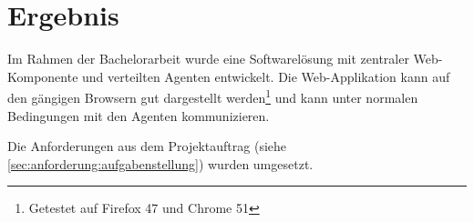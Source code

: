 \begin{comment}
Ergebnisse der Arbeit: was wurde erreicht, was wurde nicht erreicht, Ursachen.
Dieser Abschnitt richtet sich an den speziell für das entsprechende Fachgebiet
interessierten Ingenieur. Er soll es ihm ermöglichen, die für die Problemlösung
gemachten Überlegungen zu verstehen und nachzuvollziehen. Theoretische
Grundlagen sind nur so weit auszuarbeiten, als dies für die Lösung der Aufgabe
nötig ist (keine Lehrbücher schreiben). Die Erkenntnisse aus den theoretischen
Untersuchungen sind wenn immer möglich direkt mit der Problemlösung zu
verknüpfen.

Schlussfolgerungen, Bewertung der Ergebnisse.
Die Schlussfolgerungen bilden zusammen mit der Zusammenfassung die
wichtigsten Abschnitte eines Berichts und sollen daher am sorgfältigsten
ausgearbeitet sein. Die Schlussfolgerungen enthalten eine Zusammenfassung
und Beurteilung der Resultate (Vergleich mit anderen Lösungen, was wurde
erreicht, was nicht, was bleibt noch zu tun, was würde man nun anders tun). In
den Schlussfolgerungen soll auch ein Ausblick auf das weitere Vorgehen bzw.
auf die Bedeutung der erreichten Ergebnisse gegeben werden.

Installationsanleitung vorhanden (inklusive verwendete Entwicklungsumgebung und Werkzeuge), Test-Logs dokumentiert (bei Systemen mit User Interfaces: Dokumentation der Usability Tests)

Ideen für Schlussfolgerung:
* fehlendes Know-How?
* Positives
* negatives
* Vor-/Nachteile Rails? Was wenn ohne Rails gemacht?
\end{comment}

\chapter{Ergebnis}
\label{results}

Im Rahmen der Bachelorarbeit wurde eine Softwarelösung mit zentraler Web-Komponente und verteilten Agenten entwickelt. Die Web-Applikation kann auf den gängigen Browsern gut dargestellt werden\footnote{Getestet auf Firefox 47 und Chrome 51} und kann unter normalen Bedingungen mit den Agenten kommunizieren.

Die Anforderungen aus dem Projektauftrag (siehe \ref{sec:anforderung:aufgabenstellung}) wurden umgesetzt.

